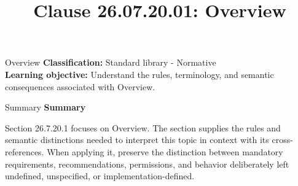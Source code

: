 \documentclass[10pt,letterpaper]{article}
\title{Clause 26.07.20.01: Overview}
\author{}
\date{}
\begin{document}
\maketitle
\begin{CornellOverviewBox}{Overview}
\textbf{Classification:} Standard library - Normative\\[2pt]
\textbf{Learning objective:} Understand the rules, terminology, and semantic consequences associated with Overview.
\end{CornellOverviewBox}\begin{CornellSummaryBox}{Summary}
{\sffamily\bfseries\color{Accent} Summary}\par\vspace{3pt}Section 26.7.20.1 focuses on Overview. The section supplies the rules and semantic distinctions needed to interpret this topic in context with its cross-references. When applying it, preserve the distinction between mandatory requirements, recommendations, permissions, and behavior deliberately left undefined, unspecified, or implementation-defined.
\end{CornellSummaryBox}
\end{document}

